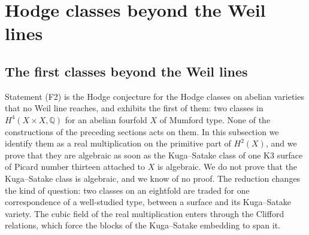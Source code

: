 \documentclass[11pt,reqno]{amsart}
\theoremstyle{plain}
\theoremstyle{definition}
\theoremstyle{remark}
\newcommand{\QQ}{\mathbb{Q}}
\begin{document}
\section{Hodge classes beyond the Weil lines}\label{sec:beyond}

\subsection{The first classes beyond the Weil lines}\label{ssec:mumford}

Statement (F2) is the Hodge conjecture for the Hodge classes on abelian
varieties that no Weil line reaches, and  exhibits
the first of them: two classes in $H^{4}(X\times X,\QQ)$ for an abelian
fourfold $X$ of Mumford type. None of the constructions of the preceding
sections acts on them. In this subsection we identify them as a real
multiplication on the primitive part of $H^{2}(X)$, and we prove that they
are algebraic as soon as the Kuga--Satake class of one K3 surface of Picard
number thirteen attached to $X$ is algebraic. We do not prove that the
Kuga--Satake class is algebraic, and we know of no proof. The reduction
changes the kind of question: two classes on an eightfold are traded for one
correspondence of a well-studied type, between a surface and its Kuga--Satake
variety. The cubic field of the real multiplication enters through the
Clifford relations, which force the blocks of the Kuga--Satake embedding to
span it.
\end{document}
